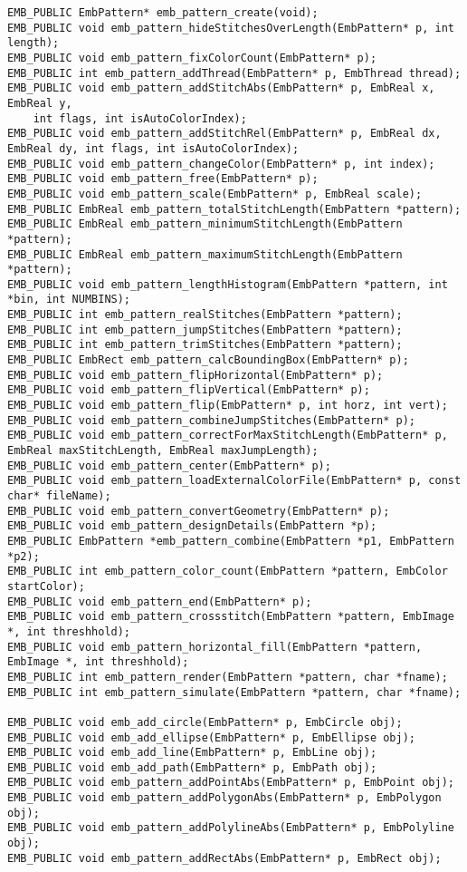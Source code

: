 \begin{verbatim}
EMB_PUBLIC EmbPattern* emb_pattern_create(void);
EMB_PUBLIC void emb_pattern_hideStitchesOverLength(EmbPattern* p, int length);
EMB_PUBLIC void emb_pattern_fixColorCount(EmbPattern* p);
EMB_PUBLIC int emb_pattern_addThread(EmbPattern* p, EmbThread thread);
EMB_PUBLIC void emb_pattern_addStitchAbs(EmbPattern* p, EmbReal x, EmbReal y,
    int flags, int isAutoColorIndex);
EMB_PUBLIC void emb_pattern_addStitchRel(EmbPattern* p, EmbReal dx, EmbReal dy, int flags, int isAutoColorIndex);
EMB_PUBLIC void emb_pattern_changeColor(EmbPattern* p, int index);
EMB_PUBLIC void emb_pattern_free(EmbPattern* p);
EMB_PUBLIC void emb_pattern_scale(EmbPattern* p, EmbReal scale);
EMB_PUBLIC EmbReal emb_pattern_totalStitchLength(EmbPattern *pattern);
EMB_PUBLIC EmbReal emb_pattern_minimumStitchLength(EmbPattern *pattern);
EMB_PUBLIC EmbReal emb_pattern_maximumStitchLength(EmbPattern *pattern);
EMB_PUBLIC void emb_pattern_lengthHistogram(EmbPattern *pattern, int *bin, int NUMBINS);
EMB_PUBLIC int emb_pattern_realStitches(EmbPattern *pattern);
EMB_PUBLIC int emb_pattern_jumpStitches(EmbPattern *pattern);
EMB_PUBLIC int emb_pattern_trimStitches(EmbPattern *pattern);
EMB_PUBLIC EmbRect emb_pattern_calcBoundingBox(EmbPattern* p);
EMB_PUBLIC void emb_pattern_flipHorizontal(EmbPattern* p);
EMB_PUBLIC void emb_pattern_flipVertical(EmbPattern* p);
EMB_PUBLIC void emb_pattern_flip(EmbPattern* p, int horz, int vert);
EMB_PUBLIC void emb_pattern_combineJumpStitches(EmbPattern* p);
EMB_PUBLIC void emb_pattern_correctForMaxStitchLength(EmbPattern* p, EmbReal maxStitchLength, EmbReal maxJumpLength);
EMB_PUBLIC void emb_pattern_center(EmbPattern* p);
EMB_PUBLIC void emb_pattern_loadExternalColorFile(EmbPattern* p, const char* fileName);
EMB_PUBLIC void emb_pattern_convertGeometry(EmbPattern* p);
EMB_PUBLIC void emb_pattern_designDetails(EmbPattern *p);
EMB_PUBLIC EmbPattern *emb_pattern_combine(EmbPattern *p1, EmbPattern *p2);
EMB_PUBLIC int emb_pattern_color_count(EmbPattern *pattern, EmbColor startColor);
EMB_PUBLIC void emb_pattern_end(EmbPattern* p);
EMB_PUBLIC void emb_pattern_crossstitch(EmbPattern *pattern, EmbImage *, int threshhold);
EMB_PUBLIC void emb_pattern_horizontal_fill(EmbPattern *pattern, EmbImage *, int threshhold);
EMB_PUBLIC int emb_pattern_render(EmbPattern *pattern, char *fname);
EMB_PUBLIC int emb_pattern_simulate(EmbPattern *pattern, char *fname);

EMB_PUBLIC void emb_add_circle(EmbPattern* p, EmbCircle obj);
EMB_PUBLIC void emb_add_ellipse(EmbPattern* p, EmbEllipse obj);
EMB_PUBLIC void emb_add_line(EmbPattern* p, EmbLine obj);
EMB_PUBLIC void emb_add_path(EmbPattern* p, EmbPath obj);
EMB_PUBLIC void emb_pattern_addPointAbs(EmbPattern* p, EmbPoint obj);
EMB_PUBLIC void emb_pattern_addPolygonAbs(EmbPattern* p, EmbPolygon obj);
EMB_PUBLIC void emb_pattern_addPolylineAbs(EmbPattern* p, EmbPolyline obj);
EMB_PUBLIC void emb_pattern_addRectAbs(EmbPattern* p, EmbRect obj);


\end{verbatim}
